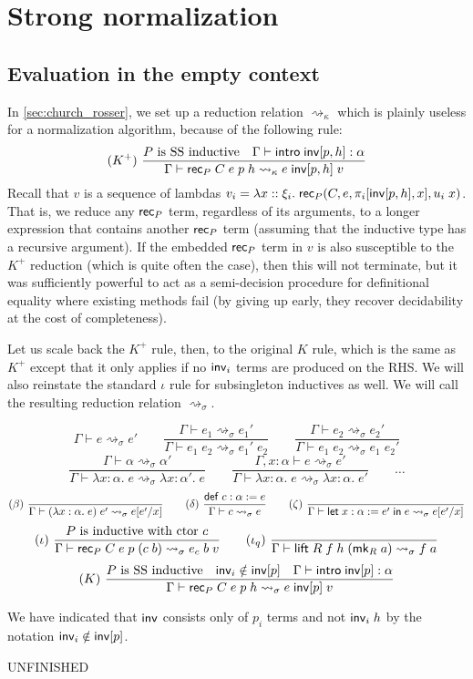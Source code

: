 \section{Strong normalization}
\subsection{Evaluation in the empty context}
In \autoref{sec:church_rosser}, we set up a reduction relation $\rightsquigarrow_\kappa$ which is plainly useless for a normalization algorithm, because of the following rule:
$$(K^+)\ \frac{P\mbox{ is SS inductive}\quad\Gamma\vdash \intro\;\inv[p,h]:\alpha}{\Gamma\vdash \rec_P\;C\;e\;p\;h\rightsquigarrow_\kappa e\;\inv[p,h]\;v}$$
Recall that $v$ is a sequence of lambdas $v_i=\lambda x::\xi_i.\;\mathsf{rec}_P(C,e,\pi_i[\mathsf{inv}[p,h],x],u_i\;x)$. That is, we reduce any $\mathsf{rec}_P$ term, regardless of its arguments, to a longer expression that contains another $\mathsf{rec}_P$ term (assuming that the inductive type has a recursive argument). If the embedded $\mathsf{rec}_P$ term in $v$ is also susceptible to the $K^+$ reduction (which is quite often the case), then this will not terminate, but it was sufficiently powerful to act as a semi-decision procedure for definitional equality where existing methods fail (by giving up early, they recover decidability at the cost of completeness).

Let us scale back the $K^+$ rule, then, to the original $K$ rule, which is the same as $K^+$ except that it only applies if no $\mathsf{inv}_i$ terms are produced on the RHS. We will also reinstate the standard $\iota$ rule for subsingleton inductives as well. We will call the resulting reduction relation $\rightsquigarrow_\sigma$.

$$\boxed{\Gamma\vdash e\rightsquigarrow_\sigma e'}\qquad
\frac{\Gamma\vdash e_1 \rightsquigarrow_\sigma e_1'}{\Gamma\vdash e_1\;e_2\rightsquigarrow_\sigma e_1'\;e_2}\qquad
\frac{\Gamma\vdash e_2 \rightsquigarrow_\sigma e_2'}{\Gamma\vdash e_1\;e_2\rightsquigarrow_\sigma e_1\;e_2'}$$
$$\frac{\Gamma\vdash \alpha \rightsquigarrow_\sigma\alpha'}{\Gamma\vdash \lambda x:\alpha.\;e\rightsquigarrow_\sigma \lambda x:\alpha'.\;e}\qquad
\frac{\Gamma,x:\alpha\vdash e \rightsquigarrow_\sigma e'}{\Gamma\vdash \lambda x:\alpha.\;e\rightsquigarrow_\sigma \lambda x:\alpha.\;e'}\qquad\dots$$
$$(\beta)\ \frac{}{\Gamma\vdash (\lambda x:\alpha.\;e)\;e'\rightsquigarrow_\sigma e[e'/x]}\qquad
(\delta)\ \frac{\mathsf{def}\;c:\alpha:=e}{\Gamma\vdash c\rightsquigarrow_\sigma e}\qquad
(\zeta)\ \frac{}{\Gamma\vdash \elet{x:\alpha:=e'}{e}\rightsquigarrow_\sigma e[e'/x]}$$
$$(\iota)\ \frac{P\mbox{ is inductive with ctor }c}{\Gamma\vdash \rec_P\;C\;e\;p\;(c\;b)\rightsquigarrow_\sigma e_c\;b\;v}\qquad
(\iota_q)\ \frac{}{\Gamma\vdash \lift\;R\;f\;h\;(\mk_R\;a)\rightsquigarrow_\sigma f\;a}$$
$$(K)\ \frac{P\mbox{ is SS inductive}\quad\inv_i\notin\inv[p]\quad\Gamma\vdash \intro\;\inv[p]:\alpha}{\Gamma\vdash \rec_P\;C\;e\;p\;h\rightsquigarrow_\sigma e\;\inv[p]\;v}$$

We have indicated that $\mathsf{inv}$ consists only of $p_i$ terms and not $\mathsf{inv}_i\;h$ by the notation $\mathsf{inv}_i\notin\mathsf{inv}[p]$.

UNFINISHED